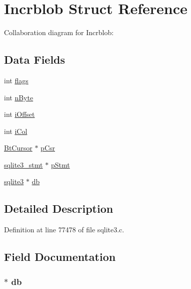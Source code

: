 \hypertarget{struct_incrblob}{}\section{Incrblob Struct Reference}
\label{struct_incrblob}


Collaboration diagram for Incrblob\+:
\subsection*{Data Fields}
\begin{DoxyCompactItemize}
\item 
int \hyperlink{struct_incrblob_ac8bf36fe0577cba66bccda3a6f7e80a4}{flags}
\item 
int \hyperlink{struct_incrblob_ae4a4d0ce9a4469ed14e6e2277254f3b1}{n\+Byte}
\item 
int \hyperlink{struct_incrblob_a7257a503e6fefa9f18d900e52ec8dc75}{i\+Offset}
\item 
int \hyperlink{struct_incrblob_a45704caa26eec073e116c7f544047e5e}{i\+Col}
\item 
\hyperlink{struct_bt_cursor}{Bt\+Cursor} $\ast$ \hyperlink{struct_incrblob_a9e635cb5153166419ad625deb508c3b3}{p\+Csr}
\item 
\hyperlink{sqlite3_8c_af2a033da1327cdd77f0a174a09aedd0c}{sqlite3\+\_\+stmt} $\ast$ \hyperlink{struct_incrblob_a67d1f816562e1a4851f044e829476aed}{p\+Stmt}
\item 
\hyperlink{structsqlite3}{sqlite3} $\ast$ \hyperlink{struct_incrblob_ad6e663497d2c934364b3bcf07496b30b}{db}
\end{DoxyCompactItemize}


\subsection{Detailed Description}


Definition at line 77478 of file sqlite3.\+c.



\subsection{Field Documentation}
\hypertarget{struct_incrblob_ad6e663497d2c934364b3bcf07496b30b}{}
\subsubsection[{db}]{$\ast$ db}\label{struct_incrblob_ad6e663497d2c934364b3bcf07496b30b}


